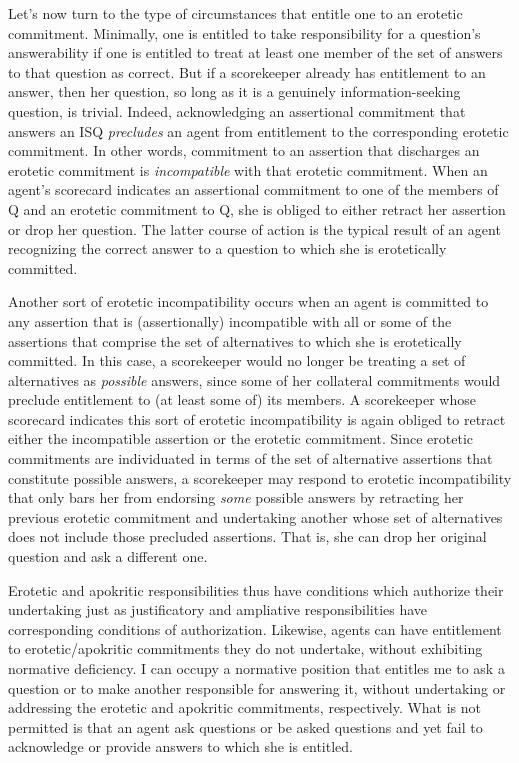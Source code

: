 \documentclass{article}                     %
\begin{document}
Let's now turn to the type of circumstances that entitle one to an
erotetic commitment. Minimally, one is entitled to take responsibility
for a question's answerability if one is entitled to treat at least
one member of the set of answers to that question as correct. But
if a scorekeeper already has entitlement to an answer, then her question,
so long as it is a genuinely information-seeking question, is trivial.
Indeed, acknowledging an assertional commitment that answers an ISQ
\emph{precludes} an agent from entitlement to the corresponding erotetic
commitment. In other words, commitment to an assertion that discharges
an erotetic commitment is \emph{incompatible} with that erotetic commitment.
When an agent's scorecard indicates an assertional commitment to one
of the members of Q and an erotetic commitment to Q, she is obliged
to either retract her assertion or drop her question. The latter course
of action is the typical result of an agent recognizing the correct
answer to a question to which she is erotetically committed. 

Another sort of erotetic incompatibility occurs when an agent is committed
to any assertion that is (assertionally) incompatible with all or
some of the assertions that comprise the set of alternatives to which
she is erotetically committed. In this case, a scorekeeper would no
longer be treating a set of alternatives as \emph{possible} answers,
since some of her collateral commitments would preclude entitlement
to (at least some of) its members. A scorekeeper whose scorecard indicates
this sort of erotetic incompatibility is again obliged to retract
either the incompatible assertion or the erotetic commitment. Since
erotetic commitments are individuated in terms of the set of alternative
assertions that constitute possible answers, a scorekeeper may respond
to erotetic incompatibility that only bars her from endorsing \emph{some}
possible answers by retracting her previous erotetic commitment and
undertaking another whose set of alternatives does not include those
precluded assertions. That is, she can drop her original question
and ask a different one.

Erotetic and apokritic responsibilities thus have conditions which
authorize their undertaking just as justificatory and ampliative responsibilities
have corresponding conditions of authorization. Likewise, agents can
have entitlement to erotetic/apokritic commitments they do not undertake,
without exhibiting normative deficiency. I can occupy a normative
position that entitles me to ask a question or to make another responsible
for answering it, without undertaking or addressing the erotetic and
apokritic commitments, respectively. What is not permitted is that
an agent ask questions or be asked questions and yet fail to acknowledge
or provide answers to which she is entitled.



\printbibliography
\end{document}
